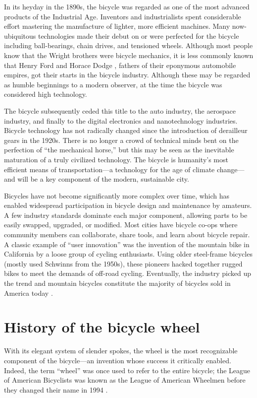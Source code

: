 \documentclass[../thesis.tex]{subfiles}
\begin{document}
In its heyday in the 1890s, the bicycle was regarded as one of the most advanced products of the Industrial Age. Inventors and industrialists spent considerable effort mastering the manufacture of lighter, more efficient machines. Many now-ubiquitous technologies made their debut on or were perfected for the bicycle including ball-bearings, chain drives, and tensioned wheels. Although most people know that the Wright brothers were bicycle mechanics, it is less commonly known that Henry Ford and Horace Dodge \cite{Reid2015}, fathers of their eponymous automobile empires, got their starts in the bicycle industry. Although these may be regarded as humble beginnings to a modern observer, at the time the bicycle was considered high technology.

The bicycle subsequently ceded this title to the auto industry, the aerospace industry, and finally to the digital electronics and nanotechnology industries. Bicycle technology has not radically changed since the introduction of derailleur gears in the 1920s. There is no longer a crowd of technical minds bent on the perfection of ``the mechanical horse,'' but this may be seen as the inevitable maturation of a truly civilized technology. The bicycle is humanity's most efficient means of transportation---a technology for the age of climate change---and will be a key component of the modern, sustainable city.

Bicycles have not become significantly more complex over time, which has enabled widespread participation in bicycle design and maintenance by amateurs. A few industry standards dominate each major component, allowing parts to be easily swapped, upgraded, or modified. Most cities have bicycle co-ops where community members can collaborate, share tools, and learn about bicycle repair. A classic example of “user innovation” was the invention of the mountain bike in California by a loose group of cycling enthusiasts. Using older steel-frame bicycles (mostly used Schwinns from the 1950s), these pioneers hacked together rugged bikes to meet the demands of off-road cycling. Eventually, the industry picked up the trend and mountain bicycles constitute the majority of bicycles sold in America today \cite{Crown1996}.


\section{History of the bicycle wheel}
With its elegant system of slender spokes, the wheel is the most recognizable component of the bicycle---an invention whose success it critically enabled. Indeed, the term ``wheel'' was once used to refer to the entire bicycle; the League of American Bicyclists was known as the League of American Wheelmen before they changed their name in 1994 \cite{Sturges}.
\end{document}
